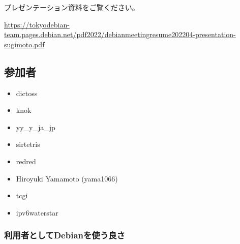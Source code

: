 \documentclass[mingoth,a4paper]{jsarticle}
\begin{document}
プレゼンテーション資料をご覧ください。

\url{https://tokyodebian-team.pages.debian.net/pdf2022/debianmeetingresume202204-presentation-sugimoto.pdf}



\subsection{参加者}

\begin{itemize}
  \item dictoss
  \item knok
  \item yy\_y\_ja\_jp
  \item sirtetris
  \item redred
  \item Hiroyuki Yamamoto (yama1066)
  \item tcgi
  \item ipv6waterstar
\end{itemize}

\subsubsection{利用者としてDebianを使う良さ}
\end{document}

